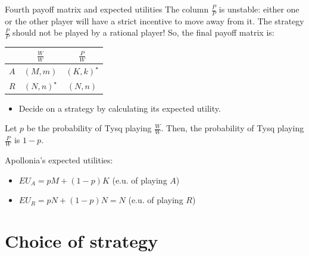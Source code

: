 \documentclass[compress]{beamer}
\begin{document}
\begin{frame}{Fourth payoff matrix and expected utilities}
The column $\frac{P}{P}$ is unstable: either one or the other player will have a
strict incentive to move away from it. The strategy $\frac{P}{P}$ should not be
played by a rational player! So, the final payoff matrix is:
\begin{center}
\begin{tabular}{c|cc}
  & $\frac{W}{W}$    & $\frac{P}{W}$ \\
\hline
$A$ & $(M,m)$        & $(K,k)^\star$  \\
$R$ & $(N,n)^\star$   & $(N,n)$  
\end{tabular}
\end{center}

\begin{itemize}
\item Decide on a strategy by calculating its \alert{expected utility}.
\end{itemize}

Let $p$ be the probability of Tysq playing $\frac{W}{W}$. Then, the probability
of Tysq playing $\frac{P}{W}$ is $1-p$.

\begin{block}{Apollonia's expected utilities:}
\begin{itemize}
\item $EU_A = pM +(1-p)K$  (e.u. of playing $A$)
\item $EU_R = pN +(1-p)N = N$ (e.u. of playing $R$)
\end{itemize}  
\end{block}

\end{frame}  

\section{Choice of strategy}
\subsection{}
\end{document}
